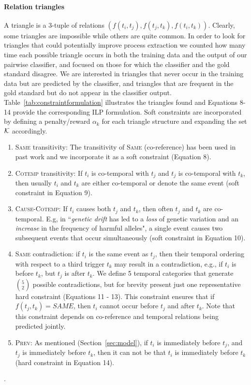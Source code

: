 \paragraph{Relation triangles} 
A triangle is a 3-tuple of relations $(f(t_i,t_j),f(t_j,t_k),f(t_i,t_k))$. Clearly, some triangles are impossible while others are quite common. In order to look for triangles that could potentially improve process extraction we counted how many time each possible triangle occurs in both the training data and the output of our pairwise classifier, and focused on those for which the classifier and the gold standard disagree. We are interested in triangles that never occur in the training data but are predicted by the classifier, and triangles that are frequent in the gold standard but do not appear in the classifier output. Table~\ref{tab:constraintformulation} illustrates the triangles found and Equations 8-14 provide the corresponding ILP formulation. Soft constraints are incorporated by defining a penalty/reward $\alpha_k$ for each triangle structure and expanding the set $\mathcal{K}$ accordingly. 
\begin{enumerate}[itemsep=0pt,topsep=0pt] 
\item \textsc{Same} transitivity: The transitivity of \textsc{Same} (co-reference) has been used in past work \cite{Finkel08} and we incorporate it as a soft constraint (Equation 8).
\item \textsc{Cotemp} transitivity:  If $t_i$ is co-temporal with $t_j$ and $t_j$ is co-temporal with $t_k$, then usually $t_i$ and $t_k$ are either co-temporal or denote the same event (soft constraint in Equation 9).
\item \textsc{Cause}-\textsc{Cotemp}: If $t_i$ causes both $t_j$ and $t_k$, then often $t_j$ and $t_k$ are co-temporal. E.g, in ``\emph{genetic drift} has led to a \emph{loss} of genetic variation and an \emph{increase} in the frequency of harmful alleles", a single event causes two subsequent events that occur simultaneously (soft constraint in Equation 10).
\item \textsc{Same} contradiction: if $t_i$ is the same event as  $t_j$, then their temporal ordering with respect to a third trigger $t_k$ may result in a contradiction, e.g., if $t_i$ is before $t_k$, but $t_j$ is after $t_k$. We define 5 temporal categories that generate $5 \choose 2$ possible contradictions, but for brevity present just one representative hard constraint (Equations 11 - 13). This constraint ensures that if $f(t_j,t_k) = SAME$, then $t_i$ cannot occur before $t_j$ and after $t_k$. Note that this constraint depends on co-reference and temporal relations being predicted jointly.
\item \textsc{Prev}: As mentioned (Section~\ref{sec:model}), if $t_i$ is immediately before $t_j$, and $t_j$ is immediately before $t_k$, then it can not be that $t_i$ is immediately before $t_k$ (hard constraint in Equation 14).
\end{enumerate}.

